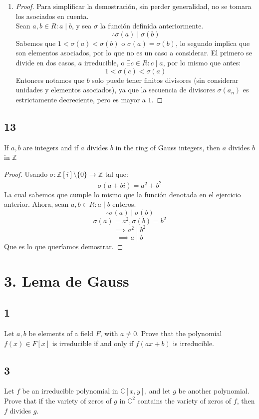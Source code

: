 \documentclass[11pt]{article}
\newcommand{\set}[1]{\mathbb{#1}}
\newcommand{\func}[5]{#1:#2\xrightarrow[#5]{#4}#3}
\theoremstyle{definition}
\begin{document}
\begin{enumerate}[label=\textbf{(\alph*)}]
        \item \begin{proof}
            Para simplificar la demostración, sin perder generalidad, no se tomara los asociados en cuenta.\\
            Sean $a,b\in R:a\mid b$, y sea $\sigma$ la función definida anteriormente.
            \[\therefore \sigma(a)\mid\sigma(b)\]
            Sabemos que $1<\sigma(a)<\sigma(b)$ o $\sigma(a)=\sigma(b)$, lo segundo implica que son elementos asociados, por lo que no es un caso a considerar. El primero se divide en dos casos, $a$ irreducible, o $\exists c\in R: c\mid a$, por lo mismo que antes:
            \[1<\sigma(c)<\sigma(a)\]
            Entonces notamos que $b$ solo puede tener finitos divisores (sin considerar unidades y elementos asociados), ya que la secuencia de divisores $\sigma(a_n)$ es estrictamente decreciente, pero es mayor a $1$.
        \end{proof}
    \end{enumerate}

    \subsection{13}
    If $a,b$ are integers and if $a$ divides $b$ in the ring of Gauss integers, then $a$ divides $b$ in $\set{Z}$
    \begin{proof}
        Usando $\func{\sigma}{\set{Z}[i]\setminus\{0\}}{\set{Z}}{}{}$ tal que:
        \[\sigma(a+bi)=a^2+b^2\]
        La cual sabemos que cumple lo mismo que la función denotada en el ejercicio anterior. Ahora, sean $a,b\in R:a\mid b$ enteros.
        \[\therefore \sigma(a)\mid\sigma(b)\]
        \[\sigma(a)=a^2,\sigma(b)=b^2\]
        \[\implies a^2\mid b^2\]
        \[\implies a\mid b\]
        Que es lo que queríamos demostrar.
    \end{proof}

    \section{3. Lema de Gauss}
    \subsection{1}
    Let $a,b$ be elements of a field $F$, with $a \neq 0$. Prove that the polynomial $f(x)\in F[x]$ is irreducible if and only if $f(ax+b)$ is irreducible.

    \subsection{3}
    Let $f$ be an irreducible polynomial in $\set{C}[x,y]$, and let $g$ be another polynomial. Prove that if the variety of zeros of $g$ in $\set{C}^2$ contains the variety of zeros of $f$, then $f$ divides $g$.
\end{document}
